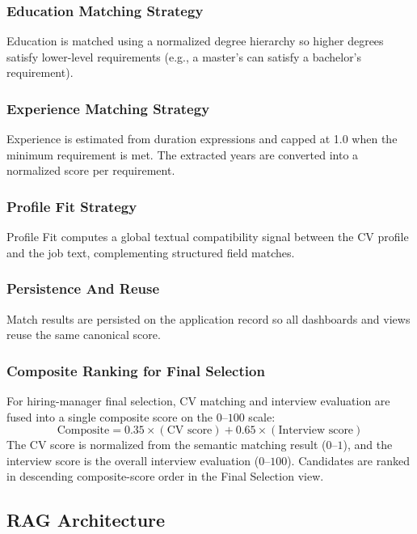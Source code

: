 \subsubsection{Education Matching Strategy}

Education is matched using a normalized degree hierarchy so higher degrees satisfy lower-level requirements (e.g., a master's can satisfy a bachelor's requirement).

\subsubsection{Experience Matching Strategy}

Experience is estimated from duration expressions and capped at 1.0 when the minimum requirement is met. The extracted years are converted into a normalized score per requirement.

\subsubsection{Profile Fit Strategy}

Profile Fit computes a global textual compatibility signal between the CV profile and the job text, complementing structured field matches.

\subsubsection{Persistence And Reuse}

Match results are persisted on the application record so all dashboards and views reuse the same canonical score.

\subsubsection{Composite Ranking for Final Selection}

For hiring-manager final selection, CV matching and interview evaluation are fused into a single composite score on the $0$--$100$ scale:
\[
\text{Composite} = 0.35 \times (\text{CV score}) + 0.65 \times (\text{Interview score})
\]
The CV score is normalized from the semantic matching result ($0$--$1$), and the interview score is the overall interview evaluation ($0$--$100$). Candidates are ranked in descending composite-score order in the Final Selection view.

\subsection{RAG Architecture}
\label{sec:sprint3:rag_architecture}

